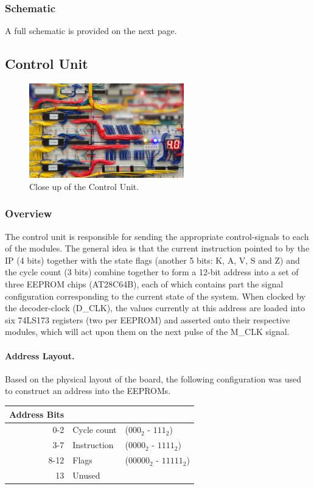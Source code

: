 \subsubsection{Schematic}
A full schematic is provided on the next page.




\subsection{Control Unit}\label{sec:implementation:cu}
\begin{figure}[H]
  \centering
  \includegraphics[width=0.6\textwidth]{img/controlunitcloseup}
  \caption{Close up of the Control Unit.}
  \label{fig:controlunitcloseup}
\end{figure}

\subsubsection{Overview}
The control unit is responsible for sending the appropriate control-signals to each of the modules. The general idea is that the current instruction pointed to by the IP (4 bits) together with the state flags (another 5 bits: K, A, V, S and Z) and the cycle count (3 bits) combine together to form a 12-bit address into a set of three EEPROM chips (AT28C64B), each of which contains part the signal configuration corresponding to the current state of the system. When clocked by the decoder-clock (D\_CLK), the values currently at this address are loaded into six 74LS173 registers (two per EEPROM) and asserted onto their respective modules, which will act upon them on the next pulse of the M\_CLK signal.

\paragraph{Address Layout.} Based on the physical layout of the board, the following configuration was used to construct an address into the EEPROMs.
\\
\begin{center}
\begin{tabular}{r|ll} 
  Address Bits & \\ \hline
  0-2  & Cycle count & ($000_2$ - $111_2$) \\
  3-7  & Instruction & ($0000_2$ - $1111_2$) \\
  8-12 & Flags  & ($00000_2$ - $11111_2$) \\
  13   & Unused & 
\end{tabular}
\end{center}


